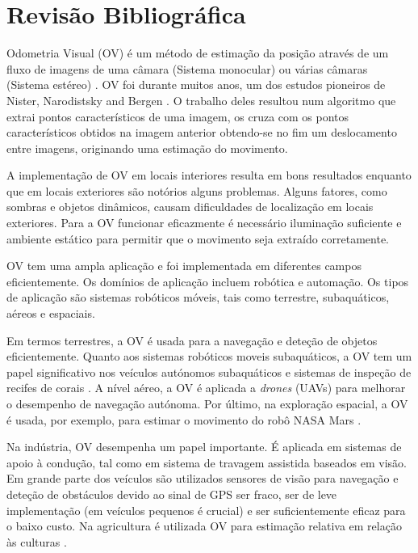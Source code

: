 \chapter{Revisão Bibliográfica}\label{chap:odometria visual}


Odometria Visual (OV) é um método de estimação da posição através de um fluxo de imagens de uma câmara (Sistema monocular) ou várias câmaras (Sistema estéreo) \cite{Ericson2018}. OV foi durante muitos anos, um dos estudos pioneiros de Nister, Narodistsky and Bergen \cite{Nisterb}. O trabalho deles resultou num algoritmo  que extrai pontos característicos de  uma imagem, os cruza com os pontos característicos obtidos na imagem anterior obtendo-se no fim um deslocamento entre imagens, originando uma estimação do movimento. 



A implementação de OV em locais interiores resulta em bons resultados enquanto que em locais exteriores são notórios alguns problemas. Alguns fatores, como sombras e objetos dinâmicos, causam  dificuldades de localização em locais exteriores. Para a OV funcionar eficazmente é necessário iluminação suficiente e ambiente estático para permitir que o movimento seja extraído corretamente. 

OV tem uma ampla aplicação e foi implementada em diferentes campos eficientemente. Os domínios de aplicação incluem robótica e automação. Os tipos de aplicação são sistemas robóticos móveis, tais como terrestre, subaquáticos, aéreos e espaciais.

Em termos terrestres, a OV é usada para a navegação e deteção de objetos eficientemente. Quanto aos sistemas robóticos moveis subaquáticos, a OV tem um papel significativo nos veículos autónomos subaquáticos e sistemas de inspeção de recifes de corais \cite{Aqel2016}. A nível aéreo, a OV é aplicada a \textit{drones} (UAVs) para melhorar o desempenho de navegação autónoma. Por último, na exploração espacial, a OV é usada, por exemplo, para estimar o movimento do robô NASA Mars  \cite{Cheng} .


Na indústria, OV desempenha um papel importante. É aplicada em sistemas de apoio à condução, tal como em sistema de travagem assistida baseados em visão.  Em grande parte dos veículos são utilizados sensores de visão para navegação e deteção de obstáculos devido ao sinal de GPS ser fraco, ser de leve implementação (em veículos pequenos é crucial) e ser suficientemente eficaz para o baixo custo.  Na agricultura é utilizada OV para estimação relativa em relação às culturas \cite{ericson2008visual,Mendes2016}.


